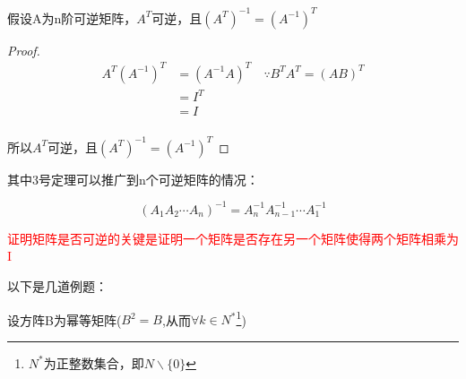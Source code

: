 \begin{example}
	假设A为n阶可逆矩阵，$A^T$可逆，且$(A^T)^{-1}=(A^{-1})^T$

	\begin{proof}
		$$
			\begin{aligned}
				A^T(A^{-1})^T & =(A^{-1}A)^T\quad \because B^TA^T=(AB)^T \\
				              & =I^T                                     \\
				              & =I                                       \\
			\end{aligned}
		$$

		所以$A^T$可逆，且$(A^T)^{-1}=(A^{-1})^T$
	\end{proof}
\end{example}

其中3号定理可以推广到n个可逆矩阵的情况：

$$
	(A_1A_2\cdots A_n)^{-1}=A_n^{-1}A_{n-1}^{-1}\cdots A_1^{-1}  $$

\textcolor{red}{证明矩阵是否可逆的关键是证明一个矩阵是否存在另一个矩阵使得两个矩阵相乘为I}

以下是几道例题：

\begin{note}

设方阵B为幂等矩阵($B^2=B$,从而$\forall  k\in N^*$\footnote[1]{$N^*$为正整数集合，即$N\backslash\{0\}$})

\end{note}

